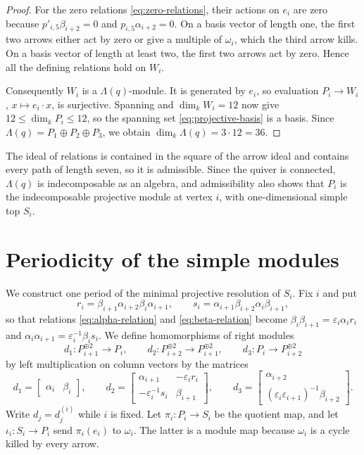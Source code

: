 \documentclass[a4paper,reqno,10pt]{amsart}
\theoremstyle{definition}
\numberwithin{equation}{section}
\newcommand{\kfield}{k}
\begin{document}
\begin{proof}
For the zero relations \eqref{eq:zero-relations}, their actions on $e_i$
are zero because $p'_{i,5}\beta_{i+2}=0$ and
$p_{i,5}\alpha_{i+2}=0$. On a basis vector of length one, the first two
arrows either act by zero or give a multiple of $\omega_i$, which the
third arrow kills. On a basis vector of length at least two, the first
two arrows act by zero. Hence all the defining relations hold on $W_i$.

Consequently $W_i$ is a $\Lambda(q)$-module. It is generated by $e_i$,
so evaluation $P_i\to W_i$, $x\mapsto e_i\cdot x$, is surjective.
Spanning and $\dim_\kfield W_i=12$ now give
$12\leq\dim_\kfield P_i\leq12$, so the spanning set
\eqref{eq:projective-basis} is a basis. Since
$\Lambda(q)=P_1\oplus P_2\oplus P_3$, we obtain
$\dim_\kfield\Lambda(q)=3\cdot12=36$.
\end{proof}

The ideal of relations is contained in the square of the arrow ideal
and contains every path of length seven, so it is admissible. Since
the quiver is connected, $\Lambda(q)$ is indecomposable as an algebra,
and admissibility also shows that
$P_i$ is the indecomposable projective module at vertex $i$, with
one-dimensional simple top $S_i$.

\section{Periodicity of the simple modules}
\label{sec:simple-periodicity}

We construct one period of the minimal projective resolution of $S_i$.
Fix $i$ and put
\[
 r_i=\beta_{i+1}\alpha_{i+2}\beta_i\alpha_{i+1},
 \qquad
 s_i=\alpha_{i+1}\beta_{i+2}\alpha_i\beta_{i+1},
\]
so that relations \eqref{eq:alpha-relation} and
\eqref{eq:beta-relation} become
$\beta_i\beta_{i+1}=\varepsilon_i\alpha_i r_i$ and
$\alpha_i\alpha_{i+1}=\varepsilon_i^{-1}\beta_i s_i$.
We define homomorphisms of right modules
\[
 d_1:P_{i+1}^{\oplus2}\longrightarrow P_i,\qquad
 d_2:P_{i+2}^{\oplus2}\longrightarrow P_{i+1}^{\oplus2},\qquad
 d_3:P_i\longrightarrow P_{i+2}^{\oplus2}
\]
by left multiplication on column vectors by the matrices
\[
 d_1=
 \begin{bmatrix}\alpha_i&\beta_i\end{bmatrix},
 \qquad
 d_2=
 \begin{bmatrix}
  \alpha_{i+1}&-\varepsilon_i r_i\\
  -\varepsilon_i^{-1}s_i&\beta_{i+1}
 \end{bmatrix},
 \qquad
 d_3=
 \begin{bmatrix}
  \alpha_{i+2}\\
  (\varepsilon_i\varepsilon_{i+1})^{-1}\beta_{i+2}
 \end{bmatrix}.
\]
Write $d_j=d_j^{(i)}$ while $i$ is fixed. Let $\pi_i:P_i\to S_i$ be the quotient map, and let
$\iota_i:S_i\to P_i$ send $\pi_i(e_i)$ to $\omega_i$. The latter
is a module map because $\omega_i$ is a cycle killed by every arrow.
\end{document}
